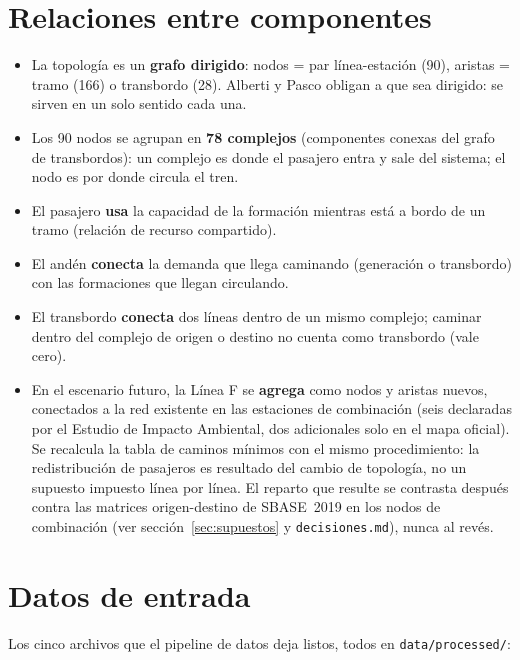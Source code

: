 \documentclass{article}
\begin{document}
\section{Relaciones entre componentes}
\label{sec:relaciones}

\begin{itemize}
  \item La topología es un \textbf{grafo dirigido}: nodos = par línea-estación (90),
    aristas = tramo (166) o transbordo (28). Alberti y Pasco obligan a que sea
    dirigido: se sirven en un solo sentido cada una.
  \item Los 90 nodos se agrupan en \textbf{78 complejos} (componentes conexas del
    grafo de transbordos): un complejo es donde el pasajero entra y sale del
    sistema; el nodo es por donde circula el tren.
  \item El pasajero \textbf{usa} la capacidad de la formación mientras está a bordo
    de un tramo (relación de recurso compartido).
  \item El andén \textbf{conecta} la demanda que llega caminando (generación o
    transbordo) con las formaciones que llegan circulando.
  \item El transbordo \textbf{conecta} dos líneas dentro de un mismo complejo;
    caminar dentro del complejo de origen o destino no cuenta como transbordo (vale
    cero).
  \item En el escenario futuro, la Línea F se \textbf{agrega} como nodos y aristas
    nuevos, conectados a la red existente en las estaciones de combinación (seis
    declaradas por el Estudio de Impacto Ambiental, dos adicionales solo en el mapa
    oficial). Se recalcula la tabla de caminos mínimos con el mismo procedimiento:
    la redistribución de pasajeros es resultado del cambio de topología, no un
    supuesto impuesto línea por línea. El reparto que resulte se contrasta después
    contra las matrices origen-destino de SBASE~2019 en los nodos de combinación
    (ver sección~\ref{sec:supuestos} y \texttt{decisiones.md}), nunca al revés.
\end{itemize}

\section{Datos de entrada}

Los cinco archivos que el pipeline de datos deja listos, todos en
\texttt{data/processed/}:
\end{document}
